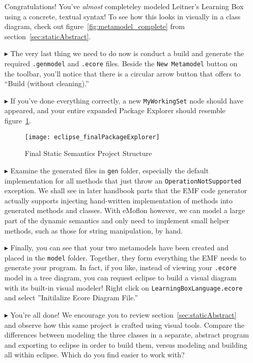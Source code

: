 \begin{itemize}
Congratulations! You've \emph{almost} completeley modeled Leitner's Learning Box using a concrete, textual syntax! To see how this looks in visually in a class diagram, check out figure~\ref{fig:metamodel_complete} from section~\ref{sec:staticAbstract}.

\item[$\blacktriangleright$]The very last thing we need to do now is conduct a build and generate the required \texttt{.genmodel} and \texttt{.ecore} files. Beside the \texttt{New Metamodel} button on the toolbar, you'll notice that there is a circular arrow button that offers to ``Build (without cleaning).'' %

\item[$\blacktriangleright$] If you've done everything correctly, a new \texttt{MyWorkingSet} node should have appeared, and your entire expanded Package Explorer should resemble figure~\ref{fig:builtModel}.

\begin{figure}[htbp]
	\centering
  \texttt{[image: eclipse\_finalPackageExplorer]}
	\caption{Final Static Semantics Project Structure}
	\label{fig:builtModel}
\end{figure}

\item[$\blacktriangleright$] Examine the generated files in \texttt{gen} folder, especially the default implementation for all methods that just throw an \texttt{OperationNotSupported} exception. We shall see in later handbook parts that the EMF code generator actually supports injecting hand-written implementation of methods into generated methods and classes. With eMoflon however, we can model a large part of the dynamic semantics and only need to implement small helper methods, such as those for string manipulation, by hand.

\item[$\blacktriangleright$] Finally, you can see that your two metamodels have been created and placed in the \texttt{model} folder. Together, they form everything the EMF needs to generate your program. In fact, if you like, instead of viewing your \texttt{.ecore} model in a tree diagram, you can request eclipse to build a visual diagram with its built-in visual modeler! Right click on \texttt{LearningBoxLanguage.ecore} and select ''Initilalize Ecore Diagram File.''


\item[$\blacktriangleright$] You're all done! We encourage you to review section~\ref{sec:staticAbstract} and observe how this same project is crafted using visual tools. Compare the differences between modeling the three classes in a separate, abstract program and exporting to eclipse in order to build them, versus modeling and building all within eclipse. Which do you find easier to work with?

\end{itemize}